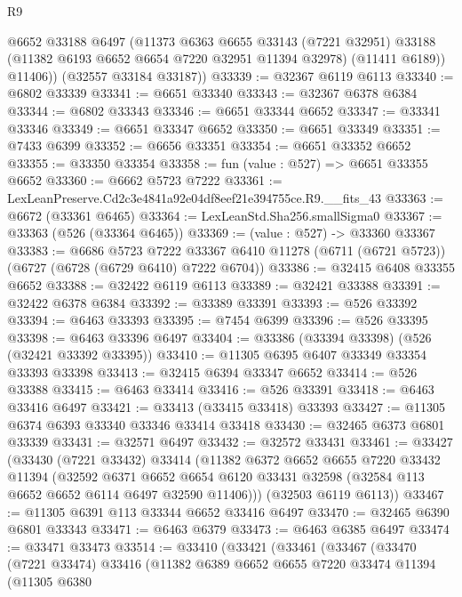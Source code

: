 \begin{lexlean}{R9}
\begin{coremodule}
          @6652
          @33188
          @6497
          (@11373
            @6363
            @6655
            @33143
            (@7221 @32951)
            @33188
            (@11382 @6193 @6652 @6654 @7220 @32951 @11394 @32978)
            (@11411 @6189))
          @11406))
      (@32557 @33184 @33187))
@33339 := @32367 @6119 @6113
@33340 := @6802 @33339
@33341 := @6651 @33340
@33343 := @32367 @6378 @6384
@33344 := @6802 @33343
@33346 := @6651 @33344 @6652
@33347 := @33341 @33346
@33349 := @6651 @33347 @6652
@33350 := @6651 @33349
@33351 := @7433 @6399
@33352 := @6656 @33351
@33354 := @6651 @33352 @6652
@33355 := @33350 @33354
@33358 := fun (value : @527) => @6651 @33355 @6652
@33360 := @6662 @5723 @7222
@33361 := LexLeanPreserve.Cd2c3e4841a92e04df8eef21e394755ce.R9.__fits_43
@33363 := @6672 (@33361 @6465)
@33364 := LexLeanStd.Sha256.smallSigma0
@33367 := @33363 (@526 (@33364 @6465))
@33369 := (value : @527) -> @33360 @33367
@33383 := @6686
    @5723
    @7222
    @33367
    @6410
    @11278
    (@6711 (@6721 @5723))
    (@6727 (@6728 (@6729 @6410) @7222 @6704))
@33386 := @32415 @6408 @33355 @6652
@33388 := @32422 @6119 @6113
@33389 := @32421 @33388
@33391 := @32422 @6378 @6384
@33392 := @33389 @33391
@33393 := @526 @33392
@33394 := @6463 @33393
@33395 := @7454 @6399
@33396 := @526 @33395
@33398 := @6463 @33396 @6497
@33404 := @33386 (@33394 @33398) (@526 (@32421 @33392 @33395))
@33410 := @11305 @6395 @6407 @33349 @33354 @33393 @33398
@33413 := @32415 @6394 @33347 @6652
@33414 := @526 @33388
@33415 := @6463 @33414
@33416 := @526 @33391
@33418 := @6463 @33416 @6497
@33421 := @33413 (@33415 @33418) @33393
@33427 := @11305 @6374 @6393 @33340 @33346 @33414 @33418
@33430 := @32465 @6373 @6801 @33339
@33431 := @32571 @6497
@33432 := @32572 @33431
@33461 := @33427
    (@33430
      (@7221 @33432)
      @33414
      (@11382
        @6372
        @6652
        @6655
        @7220
        @33432
        @11394
        (@32592
          @6371
          @6652
          @6654
          @6120
          @33431
          @32598
          (@32584 @113 @6652 @6652 @6114 @6497 @32590 @11406)))
      (@32503 @6119 @6113))
@33467 := @11305 @6391 @113 @33344 @6652 @33416 @6497
@33470 := @32465 @6390 @6801 @33343
@33471 := @6463 @6379
@33473 := @6463 @6385 @6497
@33474 := @33471 @33473
@33514 := @33410
    (@33421
      (@33461
        (@33467
          (@33470
            (@7221 @33474)
            @33416
            (@11382
              @6389
              @6652
              @6655
              @7220
              @33474
              @11394
              (@11305
                @6380

\end{coremodule}
\end{lexlean}
